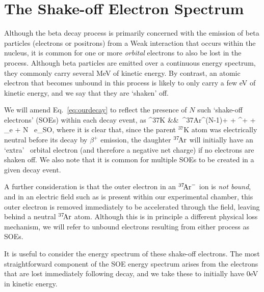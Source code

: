 \section{The Shake-off Electron Spectrum}
\label{section:soe_intro}
Although the beta decay process is primarily concerned with the emission of beta particles (electrons or positrons) from a Weak interaction that occurs within the nucleus, it is common for one or more \emph{orbital} electrons to also be lost in the process.  Although beta particles are emitted over a continuous energy spectrum, they commonly carry several MeV of kinetic energy.  By contrast, an atomic electron that becomes unbound in this process is likely to only carry a few eV of kinetic energy, and we say that they are `shaken' off.  

We will amend Eq.~\ref{eq:ourdecay} to reflect the presence of $N$ such `shake-off electrons' (SOEs) within each decay event, as
\bea
^{37}\textrm{K} &\rightarrow& \,^{37}\textrm{\!Ar}^{(N-1)+} + \beta^{+} + \nu_e + N \, e_{\textrm{SO}}, 
\label{eq:ourdecay_withsoe}
\eea
where it is clear that, since the parent $^{37}\textrm{K}$ atom was electrically neutral before its decay by $\beta^+$ emission, the daughter $^{37}\textrm{\!Ar}$ will initially have an `extra'~ orbital electron (and therefore a negative net charge) if no electrons are shaken off.  We also note that it is common for multiple SOEs to be created in a given decay event.  

A further consideration is that the outer electron in an $^{37}\textrm{\!Ar}^{-}$ ion is \emph{not bound},~ and in an electric field such as is present within our experimental chamber, this outer electron is removed immediately to be accelerated through the field, leaving behind a neutral $^{37}\textrm{\!Ar}$ atom.  Although this is in principle a different physical loss mechanism, we will refer to unbound electrons resulting from either process as SOEs.  

It is useful to consider the energy spectrum of these shake-off electrons.  The most straightforward component of the SOE energy spectrum arises from the electrons that are lost immediately following decay, and we take these to initially have 0eV in kinetic energy.  

